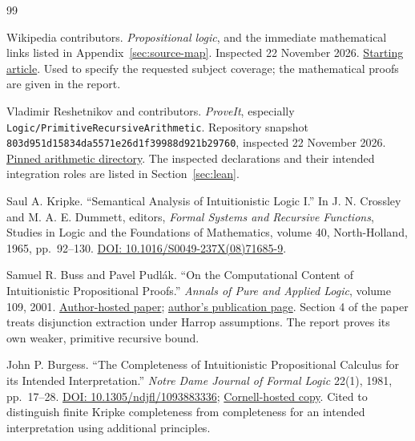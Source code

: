 {}
\begin{thebibliography}{99}
\raggedright

Wikipedia contributors.
\emph{Propositional logic}, and the immediate mathematical links listed in
Appendix~\ref{sec:source-map}. Inspected 22 November 2026.
\href{https://en.wikipedia.org/wiki/Propositional_logic}{Starting article}.
Used to specify the requested subject coverage; the mathematical proofs are
given in the report.

Vladimir Reshetnikov and contributors.
\emph{ProveIt}, especially \texttt{Logic/PrimitiveRecursiveArithmetic}.
Repository snapshot
\texttt{803d951d15834da5571e26d1f39988d921b29760}, inspected
22 November 2026.
\href{https://github.com/VladimirReshetnikov/ProveIt/tree/803d951d15834da5571e26d1f39988d921b29760/Logic/PrimitiveRecursiveArithmetic}{Pinned arithmetic directory}.
The inspected declarations and their intended integration roles are listed
in Section~\ref{sec:lean}.

Saul A. Kripke.
``Semantical Analysis of Intuitionistic Logic I.''
In J. N. Crossley and M. A. E. Dummett, editors,
\emph{Formal Systems and Recursive Functions},
Studies in Logic and the Foundations of Mathematics, volume 40,
North-Holland, 1965, pp.~92--130.
\href{https://doi.org/10.1016/S0049-237X(08)71685-9}{DOI:
10.1016/S0049-237X(08)71685-9}.

Samuel R. Buss and Pavel Pudl\'ak.
``On the Computational Content of Intuitionistic Propositional Proofs.''
\emph{Annals of Pure and Applied Logic}, volume 109, 2001.
\href{https://mathweb.ucsd.edu/~sbuss/ResearchWeb/intuitionisticDP2/paper.pdf}{Author-hosted paper};
\href{https://mathweb.ucsd.edu/~sbuss/ResearchWeb/intuitionisticDP2/index.html}{author's publication page}.
Section 4 of the paper treats disjunction extraction under Harrop
assumptions. The report proves its own weaker, primitive recursive bound.

John P. Burgess.
``The Completeness of Intuitionistic Propositional Calculus for its Intended
Interpretation.''
\emph{Notre Dame Journal of Formal Logic} 22(1), 1981, pp.~17--28.
\href{https://doi.org/10.1305/ndjfl/1093883336}{DOI:
10.1305/ndjfl/1093883336};
\href{https://www.cs.cornell.edu/courses/cs4860/2019fa/lectures/Completeness_of_intuitionistic_propositional_logic.pdf}{Cornell-hosted copy}.
Cited to distinguish finite Kripke completeness from completeness for an
intended interpretation using additional principles.


\end{thebibliography}
